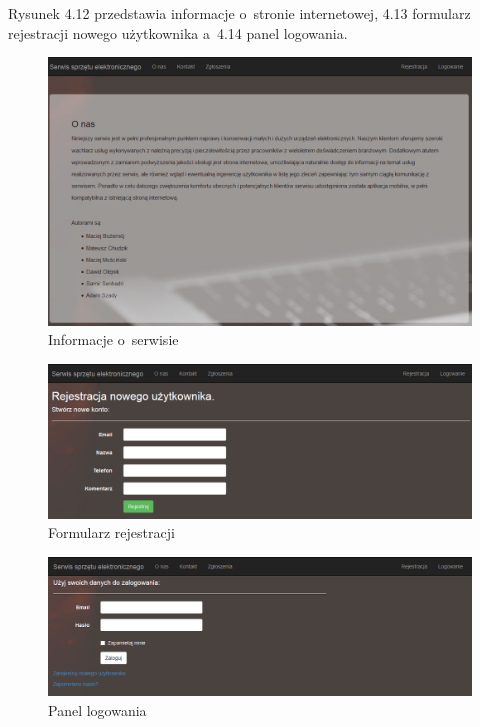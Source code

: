 \documentclass[a4paper,11pt]{article}
\begin{document}
Rysunek 4.12 przedstawia informacje o~stronie internetowej, 4.13 formularz rejestracji nowego użytkownika a~4.14 panel logowania.
\begin{figure}[H]
	\centering
	\includegraphics[width=\textwidth,height=0.6\textheight]{serwisOnas.png}
	\caption{Informacje o~serwisie}
\end{figure}
\begin{figure}[H]
	\centering
	\includegraphics[width=\textwidth,height=0.32\textheight]{serwisRejestracja.png}
	\caption{Formularz rejestracji}
\end{figure}
\begin{figure}[H]
	\centering
	\includegraphics[width=\textwidth,height=0.3\textheight]{serwisLogowanie.png}
	\caption{Panel logowania}
\end{figure}
\end{document}

